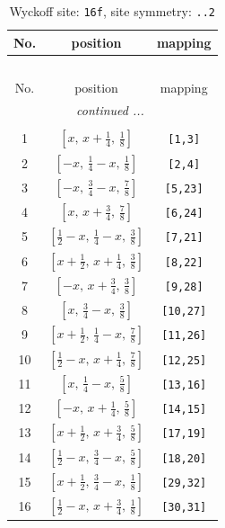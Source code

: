 \documentclass[fleqn,8pt]{jsarticle}
\begin{document}
\renewcommand{\arraystretch}{1.2}
\begin{longtable}{ccc}
\caption{Wyckoff site: {\tt 16f}, site symmetry: {\tt ..2}}
 \\
 \hline \hline
No. & position & mapping \\ \hline \endfirsthead

\multicolumn{2}{l}{\tablename\ \thetable{}} \\
 \hline \hline
No. & position & mapping \\ \hline \endhead

 \hline \hline
\multicolumn{2}{r}{\footnotesize\it continued ...} \\ \endfoot

 \hline \hline
\multicolumn{2}{r}{} \\ \endlastfoot

1 & $\left[ x,\, x + \frac{1}{4},\, \frac{1}{8} \right]$ & {\tt [1,3]} \\ \hline
2 & $\left[ - x,\, \frac{1}{4} - x,\, \frac{1}{8} \right]$ & {\tt [2,4]} \\ \hline
3 & $\left[ - x,\, \frac{3}{4} - x,\, \frac{7}{8} \right]$ & {\tt [5,23]} \\ \hline
4 & $\left[ x,\, x + \frac{3}{4},\, \frac{7}{8} \right]$ & {\tt [6,24]} \\ \hline
5 & $\left[ \frac{1}{2} - x,\, \frac{1}{4} - x,\, \frac{3}{8} \right]$ & {\tt [7,21]} \\ \hline
6 & $\left[ x + \frac{1}{2},\, x + \frac{1}{4},\, \frac{3}{8} \right]$ & {\tt [8,22]} \\ \hline
7 & $\left[ - x,\, x + \frac{3}{4},\, \frac{3}{8} \right]$ & {\tt [9,28]} \\ \hline
8 & $\left[ x,\, \frac{3}{4} - x,\, \frac{3}{8} \right]$ & {\tt [10,27]} \\ \hline
9 & $\left[ x + \frac{1}{2},\, \frac{1}{4} - x,\, \frac{7}{8} \right]$ & {\tt [11,26]} \\ \hline
10 & $\left[ \frac{1}{2} - x,\, x + \frac{1}{4},\, \frac{7}{8} \right]$ & {\tt [12,25]} \\ \hline
11 & $\left[ x,\, \frac{1}{4} - x,\, \frac{5}{8} \right]$ & {\tt [13,16]} \\ \hline
12 & $\left[ - x,\, x + \frac{1}{4},\, \frac{5}{8} \right]$ & {\tt [14,15]} \\ \hline
13 & $\left[ x + \frac{1}{2},\, x + \frac{3}{4},\, \frac{5}{8} \right]$ & {\tt [17,19]} \\ \hline
14 & $\left[ \frac{1}{2} - x,\, \frac{3}{4} - x,\, \frac{5}{8} \right]$ & {\tt [18,20]} \\ \hline
15 & $\left[ x + \frac{1}{2},\, \frac{3}{4} - x,\, \frac{1}{8} \right]$ & {\tt [29,32]} \\ \hline
16 & $\left[ \frac{1}{2} - x,\, x + \frac{3}{4},\, \frac{1}{8} \right]$ & {\tt [30,31]} \\
\end{longtable}
\end{document}
